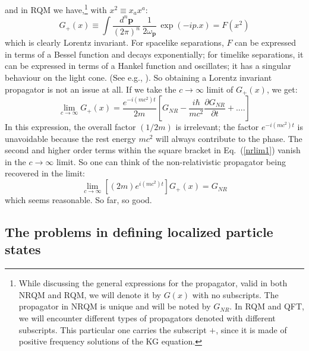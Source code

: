 \documentclass[12pt]{article}
\def\eq#1{{Eq.~(\ref{#1})}}
\begin{document}
and in RQM we have,\footnote{While discussing the general expressions for the propagator, valid in both NRQM and RQM, we will denote it by $G(x)$ with no subscripts. The propagator in NRQM is unique and will be noted by $G_{NR}$. In RQM and QFT, we will encounter different types of propagators denoted with different subscripts. This particular one carries the subscript $+$, since it is made of positive frequency solutions of the KG equation.} with $x^2 \equiv x_a x^a$:
\begin{equation}
 G_+(x)\equiv 
\int  \frac{d^n\bm{p}}{(2\pi)^n}\,\frac{1}{2\omega_{\bm{p}}} \, \exp(- i p.x)=F(x^2)
 \label{rqmg}
\end{equation}
which is clearly Lorentz invariant. For spacelike separations, $F$ can be expressed in terms of a Bessel function and decays exponentially; for timelike separations, it can be expressed in terms of a Hankel function and oscillates; it has a singular behaviour on the light cone. (See e.g., \cite{tpqft}). So obtaining a Lorentz invariant propagator is not an issue at all. If we take the $c\to\infty$ limit of 
$ G_+(x)$, we get:
\begin{equation}
 \lim_{c\to\infty}G_+(x)=\frac{e^{-i(mc^2)t}}{2m}\left[G_{NR}-\frac{i\hbar}{mc^2}\frac{\partial G_{NR}}{\partial t}+ ....\right]
 \label{nrlim1}
\end{equation} 
In this expression, the overall factor $(1/2m)$ is irrelevant; the factor $e^{-i(mc^2)t}$ is unavoidable because the rest energy $mc^2$ will always contribute  to the phase. The second and higher order terms within the  square bracket in \eq{nrlim1} vanish in the $c\to\infty$ limit. So one can think of the non-relativistic propagator being recovered  in the limit:
\begin{equation}
 \lim_{c\to\infty} [(2m) e^{i(mc^2)t}]G_+(x)=G_{NR}
 \label{plustonr}
\end{equation} 
which seems reasonable.
So far, so good.

\subsection{The problems in defining localized particle states}
\end{document}
